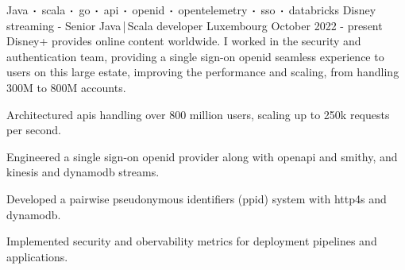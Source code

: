 
\newcommand*{\logo}[2]{\raisebox{-0.2em}{\texttt{[image: \#2]}}\hspace{0.25em}#1}
\newcommand*{\logoonly}[1]{\raisebox{-0.2em}{\texttt{[image: \#1]}}}

\begin{cventries}
    \cventry
    {Java$\sqbig$scala$\sqbig$go$\sqbig$api$\sqbig$openid$\sqbig$opentelemetry$\sqbig$sso$\sqbig$databricks}
    {\logo{Disney streaming}{../../../images/disney.png} - Senior Java\,|\,Scala developer}
    {Luxembourg}
    {October 2022 - present}
    {Disney+ provides online content worldwide. I worked in the security and authentication team, providing a single sign-on openid seamless experience to users on this large estate, improving the performance and scaling, from handling 300M to 800M accounts.}
    {
        \begin{cvitems}
            \item{Architectured apis handling over 800 million users, scaling up to 250k requests per second.}
            \item{Engineered a single sign-on openid provider along with openapi and smithy, and kinesis and dynamodb streams.}
            \item{Developed a pairwise pseudonymous identifiers (ppid) system with http4s and dynamodb.}
            \item{Implemented security and obervability metrics for deployment pipelines and applications.}
        \end{cvitems}
    }


\end{cventries}
